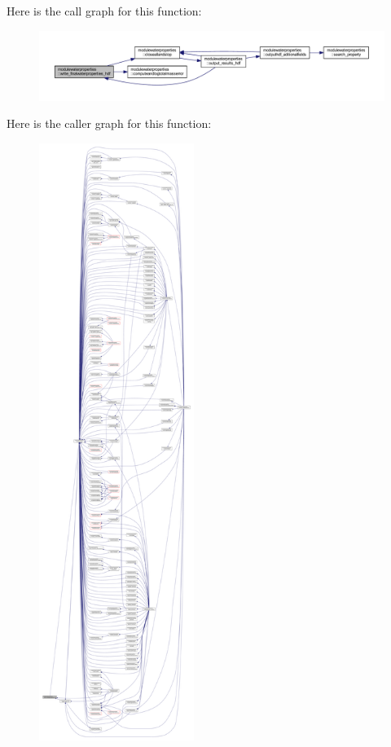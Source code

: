 Here is the call graph for this function\+:\nopagebreak
\begin{figure}[H]
\begin{center}
\leavevmode
\includegraphics[width=350pt]{namespacemodulewaterproperties_a2893cea8ca427b1290aeb65593659aa0_cgraph}
\end{center}
\end{figure}
Here is the caller graph for this function\+:\nopagebreak
\begin{figure}[H]
\begin{center}
\leavevmode
\includegraphics[height=550pt]{namespacemodulewaterproperties_a2893cea8ca427b1290aeb65593659aa0_icgraph}
\end{center}
\end{figure}
\mbox{\label{namespacemodulewaterproperties_ad35241441c35aaaf61a0529c6be215e9}} 
